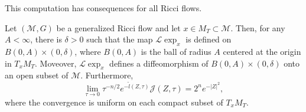 This computation has consequences for all Ricci flows.

\begin{proposition}\label{prop:reduced-volume-integrand-limit}
\label{Jlimit}
Let $({\mathcal M},G)$ be a generalized Ricci flow and let $x\in M_T\subset
{\mathcal M}$. Then, for any $A<\infty$, there is $\delta>0$ such that the map
${\mathcal L}\exp_x$ is defined on $B(0,A)\times (0,\delta)$, where
$B(0,A)$ is the ball of radius $A$ centered at the origin in $T_xM_T$.
Moveover, ${\mathcal L}\exp_x$ defines a diffeomorphism of $B(0,A)\times
(0,\delta)$ onto an open subset of ${\mathcal M}$. Furthermore,
$$\lim_{\tau\rightarrow 0}\tau^{-n/2}e^{-\tilde l(Z,\tau)}{\mathcal J}(Z,\tau)=2^ne^{-|Z|^2},$$
where the convergence is uniform on each compact subset of $T_xM_T$.
\end{proposition}

